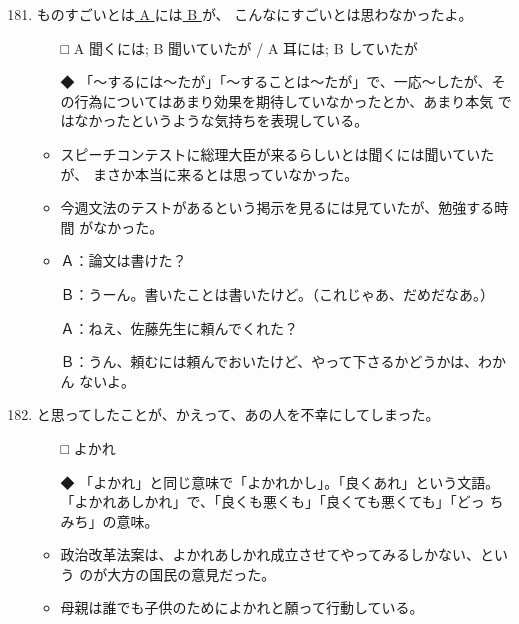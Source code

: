 \documentclass[
uplatex,
b5paper,
10pt,
dvipdfmx
]{jsbook}
\begin{document}
\begin{enumerate}
\setcounter{enumi}{180}

\item ものすごいとは\underline{ A }には\underline{ B }が、
      こんなにすごいとは思わなかったよ。

\begin{itemize}
\item[□] A 聞くには; B 聞いていたが / A 耳には; B していたが
\item[◆] 「〜するには〜たが」「〜することは〜たが」で、一応〜したが、そ
	  の行為についてはあまり効果を期待していなかったとか、あまり本気
	  ではなかったというような気持ちを表現している。
\end{itemize}
\begin{itemize}
\item スピーチコンテストに総理大臣が来るらしいとは聞くには聞いていたが、
      まさか本当に来るとは思っていなかった。
\item 今週文法のテストがあるという掲示を見るには見ていたが、勉強する時間
      がなかった。
\item Ａ：論文は書けた？

      Ｂ：うーん。書いたことは書いたけど。（これじゃあ、だめだなあ。）

      Ａ：ねえ、佐藤先生に頼んでくれた？

      Ｂ：うん、頼むには頼んでおいたけど、やって下さるかどうかは、わかん
      ないよ。
\end{itemize}

\item \underline{   }と思ってしたことが、かえって、あの人を不幸にしてしまった。
\begin{itemize}
\item[□] よかれ
\item[◆] 「よかれ」と同じ意味で「よかれかし」。「良くあれ」という文語。
	  「よかれあしかれ」で、「良くも悪くも」「良くても悪くても」「どっ
	  ちみち」の意味。
\end{itemize}
\begin{itemize}
\item 政治改革法案は、よかれあしかれ成立させてやってみるしかない、という
      のが大方の国民の意見だった。
\item 母親は誰でも子供のためによかれと願って行動している。
\end{itemize}


\end{enumerate}
\end{document}
